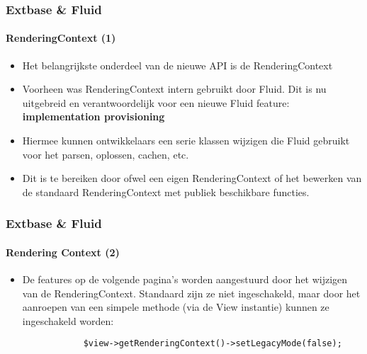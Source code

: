 \begin{frame}[fragile]
	\frametitle{Extbase \& Fluid}
	\framesubtitle{RenderingContext (1)}

	\lstset{basicstyle=\tiny\ttfamily}

	\begin{itemize}

		\item Het belangrijkste onderdeel van de nieuwe API is de RenderingContext

		\item Voorheen was RenderingContext intern gebruikt door Fluid. Dit is nu uitgebreid
			en verantwoordelijk voor een nieuwe Fluid feature:
			\textbf{implementation provisioning}

		\item Hiermee kunnen ontwikkelaars een serie klassen wijzigen die Fluid gebruikt voor
			het parsen, oplossen, cachen, etc.

		\item Dit is te bereiken door ofwel een eigen RenderingContext of
			het bewerken van de standaard RenderingContext met publiek beschikbare functies.

	\end{itemize}

\end{frame}


\begin{frame}[fragile]
	\frametitle{Extbase \& Fluid}
	\framesubtitle{Rendering Context (2)}

	\lstset{basicstyle=\smaller\ttfamily}

	\begin{itemize}

		\item De features op de volgende pagina's worden aangestuurd door het wijzigen van de
			RenderingContext. Standaard zijn ze niet ingeschakeld, maar door het aanroepen van
			een simpele methode (via de View instantie) kunnen ze ingeschakeld worden:

		\begin{lstlisting}
			$view->getRenderingContext()->setLegacyMode(false);
		\end{lstlisting}

	\end{itemize}

\end{frame}

